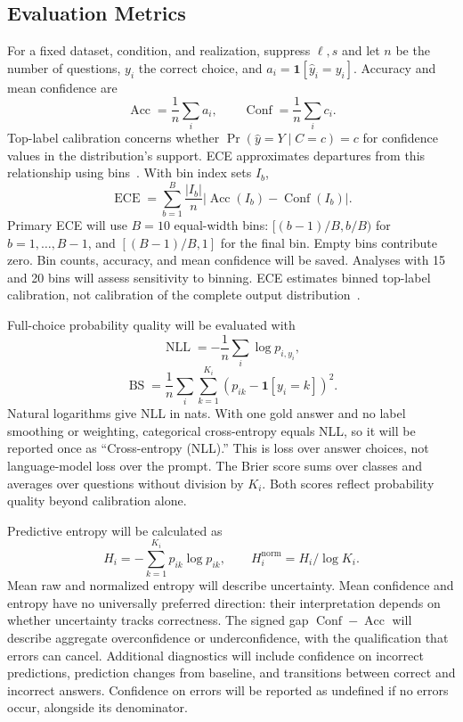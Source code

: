 \documentclass[conference]{IEEEtran}
\newcommand{\ind}{\mathbf{1}}
\newcommand{\Acc}{\operatorname{Acc}}
\newcommand{\Conf}{\operatorname{Conf}}
\newcommand{\ECE}{\operatorname{ECE}}
\newcommand{\NLL}{\operatorname{NLL}}
\newcommand{\BS}{\operatorname{BS}}
\begin{document}
\subsection{Evaluation Metrics}
For a fixed dataset, condition, and realization, suppress $\ell,s$ and let $n$ be the number of questions, $y_i$ the correct choice, and $a_i=\ind[\hat y_i=y_i]$. Accuracy and mean confidence are
\begin{equation}
\Acc=\frac{1}{n}\sum_i a_i,\qquad
\Conf=\frac{1}{n}\sum_i c_i.
\end{equation}
Top-label calibration concerns whether $\Pr(\hat y=Y\mid C=c)=c$ for confidence values in the distribution's support. ECE approximates departures from this relationship using bins~\cite{guo2017}. With bin index sets $I_b$,
\begin{equation}
\ECE=\sum_{b=1}^{B}\frac{|I_b|}{n}
\left|\Acc(I_b)-\Conf(I_b)\right|.
\end{equation}
Primary ECE will use $B=10$ equal-width bins: $[(b-1)/B,b/B)$ for $b=1,\ldots,B-1$, and $[(B-1)/B,1]$ for the final bin. Empty bins contribute zero. Bin counts, accuracy, and mean confidence will be saved. Analyses with 15 and 20 bins will assess sensitivity to binning. ECE estimates binned top-label calibration, not calibration of the complete output distribution~\cite{vaicenavicius2019}.

Full-choice probability quality will be evaluated with
\begin{equation}
\NLL=-\frac{1}{n}\sum_i\log p_{i,y_i},
\end{equation}
\begin{equation}
\BS=\frac{1}{n}\sum_i\sum_{k=1}^{K_i}
\left(p_{ik}-\ind[y_i=k]\right)^2.
\end{equation}
Natural logarithms give NLL in nats. With one gold answer and no label smoothing or weighting, categorical cross-entropy equals NLL, so it will be reported once as ``Cross-entropy (NLL).'' This is loss over answer choices, not language-model loss over the prompt. The Brier score sums over classes and averages over questions without division by $K_i$. Both scores reflect probability quality beyond calibration alone.

Predictive entropy will be calculated as
\begin{equation}
H_i=-\sum_{k=1}^{K_i}p_{ik}\log p_{ik},\qquad
H_i^{\mathrm{norm}}=H_i/\log K_i.
\end{equation}
Mean raw and normalized entropy will describe uncertainty. Mean confidence and entropy have no universally preferred direction: their interpretation depends on whether uncertainty tracks correctness. The signed gap $\Conf-\Acc$ will describe aggregate overconfidence or underconfidence, with the qualification that errors can cancel. Additional diagnostics will include confidence on incorrect predictions, prediction changes from baseline, and transitions between correct and incorrect answers. Confidence on errors will be reported as undefined if no errors occur, alongside its denominator.
\end{document}
